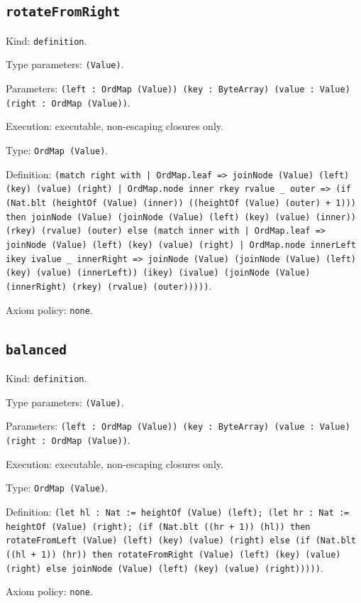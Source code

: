 \documentclass[11pt]{article}
\begin{document}
\subsection*{\texttt{rotateFromRight}}
\noindent Kind: \texttt{definition}.\par
\noindent Type parameters: \texttt{(Value)}.\par
\noindent Parameters: \texttt{(left : OrdMap (Value)) (key : ByteArray) (value : Value) (right : OrdMap (Value))}.\par
\noindent Execution: executable, non-escaping closures only.\par
\noindent Type: \texttt{OrdMap (Value)}.\par
\noindent Definition: \texttt{(match right with | OrdMap.leaf => joinNode (Value) (left) (key) (value) (right) | OrdMap.node inner rkey rvalue \_ outer => (if (Nat.blt (heightOf (Value) (inner)) ((heightOf (Value) (outer) + 1))) then joinNode (Value) (joinNode (Value) (left) (key) (value) (inner)) (rkey) (rvalue) (outer) else (match inner with | OrdMap.leaf => joinNode (Value) (left) (key) (value) (right) | OrdMap.node innerLeft ikey ivalue \_ innerRight => joinNode (Value) (joinNode (Value) (left) (key) (value) (innerLeft)) (ikey) (ivalue) (joinNode (Value) (innerRight) (rkey) (rvalue) (outer)))))}.\par
\noindent Axiom policy: \texttt{none}.\par
\subsection*{\texttt{balanced}}
\noindent Kind: \texttt{definition}.\par
\noindent Type parameters: \texttt{(Value)}.\par
\noindent Parameters: \texttt{(left : OrdMap (Value)) (key : ByteArray) (value : Value) (right : OrdMap (Value))}.\par
\noindent Execution: executable, non-escaping closures only.\par
\noindent Type: \texttt{OrdMap (Value)}.\par
\noindent Definition: \texttt{(let hl : Nat := heightOf (Value) (left); (let hr : Nat := heightOf (Value) (right); (if (Nat.blt ((hr + 1)) (hl)) then rotateFromLeft (Value) (left) (key) (value) (right) else (if (Nat.blt ((hl + 1)) (hr)) then rotateFromRight (Value) (left) (key) (value) (right) else joinNode (Value) (left) (key) (value) (right)))))}.\par
\noindent Axiom policy: \texttt{none}.\par
\end{document}
